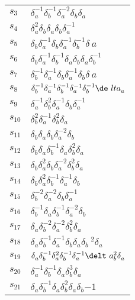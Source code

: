 \documentclass{article}
\begin{document}
\begin{center}
\begin{tabular}{ll}
$s_{3}$ & $\delta_a^{-1}\delta_b^{-1}\delta_a^{-2}\delta_b^{}\delta_a^{}$ \\
$s_{4}$ & $\delta_a^{2}\delta_b^{}\delta_a^{}\delta_b^{}\delta_a^{-1}$ \\
$s_{5}$ & $\delta_b^{}\delta_a^{-1}\delta_b^{}\delta_a^{-1}\delta_b^{-1}\delta_\
a^{}$ \\
$s_{6}$ & $\delta_b^{}\delta_a^{-1}\delta_b^{-1}\delta_a^{}\delta_b^{}\delta_a^\
{}\delta_b^{-1}$ \\
$s_{7}$ & $\delta_b^{-1}\delta_a^{-1}\delta_b^{}\delta_a^{-1}\delta_b^{}\delta_\
a^{}$ \\
$s_{8}$ & $\delta_b^{-1}\delta_a^{-1}\delta_b^{-1}\delta_a^{-1}\delta_b^{-1}\de\
lta_a^{}$ \\
$s_{9}$ & $\delta_a^{-1}\delta_b^{2}\delta_a^{-1}\delta_b^{}\delta_a^{-1}$ \\
$s_{10}$ & $\delta_b^{2}\delta_a^{-1}\delta_b^{2}\delta_a^{}$ \\
$s_{11}$ & $\delta_b^{}\delta_a^{}\delta_b^{}\delta_a^{-2}\delta_b^{}$ \\
$s_{12}$ & $\delta_b^{}\delta_a^{}\delta_b^{-1}\delta_a^{}\delta_b^{2}\delta_a^\
{}$ \\
$s_{13}$ & $\delta_b^{}\delta_a^{2}\delta_b^{}\delta_a^{-2}\delta_b^{2}\delta_a\
^{}$ \\
$s_{14}$ & $\delta_b^{}\delta_a^{2}\delta_b^{-1}\delta_a^{-1}\delta_b^{}$ \\
$s_{15}$ & $\delta_b^{-2}\delta_a^{-2}\delta_b^{}\delta_a^{-1}$ \\
$s_{16}$ & $\delta_b^{-1}\delta_a^{}\delta_b^{-1}\delta_a^{-2}\delta_b^{}$ \\
$s_{17}$ & $\delta_a^{}\delta_b^{-2}\delta_a^{-2}\delta_b^{2}\delta_a^{}$ \\
$s_{18}$ & $\delta_a^{}\delta_b^{-1}\delta_a^{-1}\delta_b^{}\delta_a^{}\delta_b\
^{2}\delta_a^{}$ \\
$s_{19}$ & $\delta_a^{}\delta_b^{-1}\delta_a^{2}\delta_b^{-1}\delta_a^{-1}\delt\
a_b^{2}\delta_a^{}$ \\
$s_{20}$ & $\delta_a^{-1}\delta_b^{-1}\delta_a^{}\delta_b^{3}\delta_a^{}$ \\
$s_{21}$ & $\delta_a^{}\delta_b^{-1}\delta_a^{}\delta_b^{2}\delta_a^{}\delta_b^\
{-1}$ \\
\bottomrule
\end{tabular}
\end{center}

\thispagestyle{empty}
\end{document}
